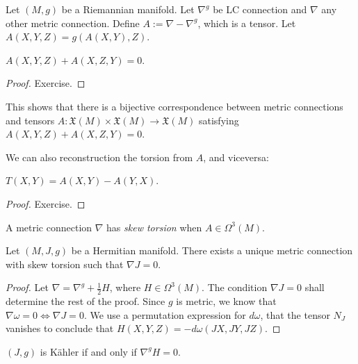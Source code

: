 \noindent
Let $(M,g)$ be a Riemannian manifold.
Let $\nabla^g$ be LC connection and
$\nabla$ any other metric connection.
Define $A:= \nabla-\nabla^g$,
which is a tensor.
Let $A(X,Y,Z)=g(A(X,Y),Z)$.

\begin{lemma}
\label{lemma-torsion-connections}
$A(X,Y,Z)+A(X,Z,Y)=0$.
\end{lemma}

\begin{proof}
Exercise.
\end{proof}

\noindent
This shows that there is a bijective
correspondence between metric connections
and tensors $A:\mathfrak{X}(M) \times
\mathfrak{X}(M) \to \mathfrak{X}(M)$
satisfying $A(X,Y,Z)+A(X,Z,Y)=0$.

We can also reconstruction the torsion
from $A$, and viceversa:

\begin{lemma}
\label{lemma-torsion-connections2}
$T(X,Y)=A(X,Y)-A(Y,X)$.
\end{lemma}

\begin{proof}
Exercise.
\end{proof}

\begin{definition}
\label{definition-skew-torsion}
A metric connection $\nabla$ has
{\it skew torsion} when
$A \in \Omega^3(M)$.
\end{definition}

\begin{theorem}
\label{theorem-strominger-bismut}
Let $(M,J,g)$ be a Hermitian manifold.
There exists a unique metric connection with
skew torsion such that $\nabla J=0$.
\end{theorem}

\begin{proof}
Let $\nabla=\nabla^g + \frac{1}{2}H$,
where $H \in \Omega^3(M)$.
The condition $\nabla J=0$ shall
determine the rest of the proof.
Since $g$ is metric, we know that
$\nabla \omega=0 \iff \nabla J=0$.
We use a permutation expression for
$d \omega$, that the tensor $N_J$ vanishes
to conclude that
$H(X,Y,Z) = -d \omega(JX,JY,JZ)$.
\end{proof}

\begin{corollary}
\label{lemma-kahler-bismut}
$(J,g)$ is Kähler if and only if
$\nabla^g H =0 $.
\end{corollary}

